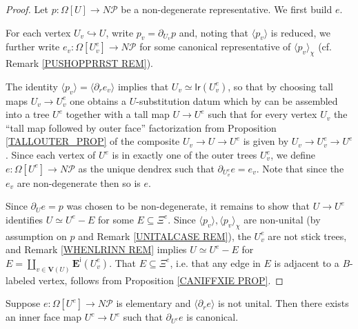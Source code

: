 \documentclass[a4paper,10pt
,draft
]{article}%
\renewcommand{\1}{\eta}%
\begin{document}
\begin{proof}
Let $p\colon \Omega[U] \to N \mathcal{P}$
be a non-degenerate representative. We first build $e$.

For each vertex $U_v \hookrightarrow U$, write
$p_v = \partial_{U_v} p$
and,
noting that $\langle p_v \rangle$ is reduced,
we further write 
$e_v \colon \Omega[U^e_v] \to N \mathcal{P}$
for some canonical representative of 
$\langle p_v \rangle_{\chi}$
(cf. Remark \ref{PUSHOPPRRST REM}).


The identity
$\langle p_v \rangle = \langle \partial_r e_v \rangle$
implies that
$U_v \simeq \mathsf{lr}(U^e_v)$,
so that by choosing tall maps $U_v \to U^e_v$ 
one obtains a $U$-substitution datum
\cite[Def. 3.38]{BP_geo}
which by 
\cite[Prop. 3.41]{BP_geo}
can be assembled into a tree $U^e$
together with a tall map
$U \to U^e$ such that for every vertex $U_v$
the ``tall map followed by outer face'' factorization from Proposition \ref{TALLOUTER_PROP} of
the composite
$U_v \to U \to U^e$
is given by
$U_v \to U^e_v \to U^e$.
Since each vertex of $U^e$ is in exactly one of the outer trees $U^e_v$,
we define $e \colon \Omega[U^e] \to N \mathcal{P}$
as the unique dendrex such that
$\partial_{U^e_v} e = e_v$.
Note that since the $e_v$ are non-degenerate 
then so is $e$.


Since $\partial_{U}e = p$ was chosen to be non-degenerate,
it remains to show that
$U \to U^e$ identifies $U \simeq U^e - E$
for some $E \subseteq \Xi^{e}$.
Since $\langle p_v \rangle, \langle p_v \rangle_{\chi}$ are non-unital
(by assumption on $p$ and Remark \ref{UNITALCASE REM}),
the $U^e_v$ are not stick trees,
and Remark \ref{WHENLRINN REM} implies
$U \simeq U^e-E$ for 
$E = \amalg_{v \in \boldsymbol{V}(U)} \boldsymbol{E}^{\mathsf{i}}(U^e_v)$.
%
That
$E \subseteq \Xi^{e}$, i.e. that any edge in $E$ is adjacent to a $B$-labeled vertex,
follows from Proposition \ref{CANIFFXIE PROP}.
\end{proof}


\begin{lemma}\label{FORSAKEN LEM}
Suppose $e \colon \Omega[U^e] \to N \mathcal{P}$ is elementary
and $\langle \partial_r e\rangle$ is not unital.
Then there exists an inner face map
$U^c \to U^e$ such that $\partial_{U^c} e$ is canonical.

\end{lemma}
\end{document}
